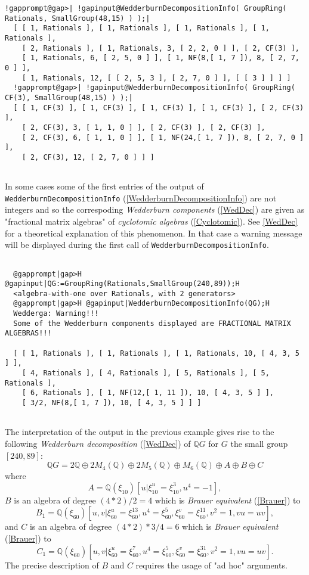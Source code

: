 \documentclass[a4paper,11pt]{report}
\begin{document}
{{\begin{Verbatim}[commandchars=!@|,fontsize=\small,frame=single,label=Example]
  !gapprompt@gap>| !gapinput@WedderburnDecompositionInfo( GroupRing( Rationals, SmallGroup(48,15) ) );|
  [ [ 1, Rationals ], [ 1, Rationals ], [ 1, Rationals ], [ 1, Rationals ],
    [ 2, Rationals ], [ 1, Rationals, 3, [ 2, 2, 0 ] ], [ 2, CF(3) ],
    [ 1, Rationals, 6, [ 2, 5, 0 ] ], [ 1, NF(8,[ 1, 7 ]), 8, [ 2, 7, 0 ] ],
    [ 1, Rationals, 12, [ [ 2, 5, 3 ], [ 2, 7, 0 ] ], [ [ 3 ] ] ] ]  
  !gapprompt@gap>| !gapinput@WedderburnDecompositionInfo( GroupRing( CF(3), SmallGroup(48,15) ) );|
  [ [ 1, CF(3) ], [ 1, CF(3) ], [ 1, CF(3) ], [ 1, CF(3) ], [ 2, CF(3) ],
    [ 2, CF(3), 3, [ 1, 1, 0 ] ], [ 2, CF(3) ], [ 2, CF(3) ],
    [ 2, CF(3), 6, [ 1, 1, 0 ] ], [ 1, NF(24,[ 1, 7 ]), 8, [ 2, 7, 0 ] ],
    [ 2, CF(3), 12, [ 2, 7, 0 ] ] ]
  
\end{Verbatim}
 In some cases some of the first entries of the output of \texttt{WedderburnDecompositionInfo} (\ref{WedderburnDecompositionInfo}) are not integers and so the correspoding \emph{Wedderburn components} (\ref{WedDec}) are given as "fractional matrix algebras" of \emph{cyclotomic algebras} (\ref{Cyclotomic}). See \ref{WedDec} for a theoretical explanation of this phenomenon. In that case a warning
message will be displayed during the first call of \texttt{WedderburnDecompositionInfo}. 
\begin{Verbatim}[commandchars=@|H,fontsize=\small,frame=single,label=Example]
  
  @gapprompt|gap>H @gapinput|QG:=GroupRing(Rationals,SmallGroup(240,89));H
  <algebra-with-one over Rationals, with 2 generators>
  @gapprompt|gap>H @gapinput|WedderburnDecompositionInfo(QG);H
  Wedderga: Warning!!! 
  Some of the Wedderburn components displayed are FRACTIONAL MATRIX ALGEBRAS!!!
  
  [ [ 1, Rationals ], [ 1, Rationals ], [ 1, Rationals, 10, [ 4, 3, 5 ] ],
    [ 4, Rationals ], [ 4, Rationals ], [ 5, Rationals ], [ 5, Rationals ],
    [ 6, Rationals ], [ 1, NF(12,[ 1, 11 ]), 10, [ 4, 3, 5 ] ],
    [ 3/2, NF(8,[ 1, 7 ]), 10, [ 4, 3, 5 ] ] ]
  
\end{Verbatim}
 The interpretation of the output in the previous example gives rise to the
following \emph{Wedderburn decomposition} (\ref{WedDec}) of ${\ensuremath{\mathbb Q}} G$ for $G$ the small group $[240,89]$: 
\[ {\ensuremath{\mathbb Q}} G = 2 {\ensuremath{\mathbb Q}} \oplus 2 M_4(
{\ensuremath{\mathbb Q}} ) \oplus 2 M_5( {\ensuremath{\mathbb Q}} ) \oplus
M_6( {\ensuremath{\mathbb Q}} ) \oplus A \oplus B \oplus C \]
 where 
\[ A = {\ensuremath{\mathbb Q}} (\xi_{10})[u|\xi_{10}^u = \xi_{10}^3, u^4 = -1], \]
 $B$ is an algebra of degree $(4*2 )/2 = 4 $ which is \emph{Brauer equivalent} (\ref{Brauer}) to 
\[ B_1 = {\ensuremath{\mathbb Q}} (\xi_{60})[u,v|\xi_{60}^u = \xi_{60}^{13}, u^4
= \xi_{60}^5, \xi_{60}^v = \xi_{60}^{11}, v^2 = 1, vu=uv], \]
 and $C$ is an algebra of degree $(4*2)*3/4 = 6 $ which is \emph{Brauer equivalent} (\ref{Brauer}) to 
\[ C_1 = {\ensuremath{\mathbb Q}} (\xi_{60})[u,v|\xi_{60}^u = \xi_{60}^7, u^4 =
\xi_{60}^5, \xi_{60}^v = \xi_{60}^{31}, v^2 = 1, vu=uv]. \]
 The precise description of $B$ and $C$ requires the usage of "ad hoc" arguments. }

}
\end{document}
